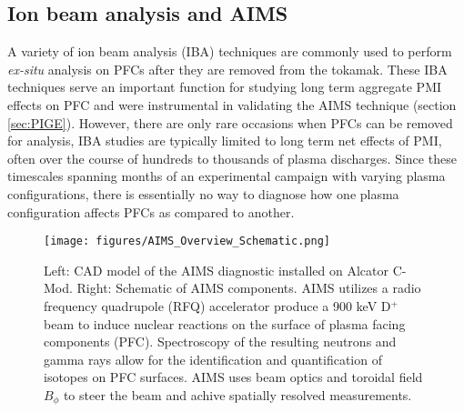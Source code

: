 \documentclass[final,3p,times,twocolumn]{elsarticle}
\begin{document}
\subsection{Ion beam analysis and AIMS}
\label{sec:AIMSOverview}

A variety of ion beam analysis (IBA) techniques are commonly used to perform \textit{ex-situ} analysis on PFCs after they are removed from the tokamak. These IBA techniques serve an important function for studying long term aggregate PMI effects on PFC \cite{wright2011plasma} and were instrumental in validating the AIMS technique (section \ref{sec:PIGE}). However, there are only rare occasions when PFCs can be removed for analysis, IBA studies are typically limited to long term net effects of PMI, often over the course of hundreds to thousands of plasma discharges.  Since these timescales spanning months of an experimental campaign with varying plasma configurations, there is essentially no way to diagnose how one plasma configuration affects PFCs as compared to another.


\begin{figure*}[h]
 \centering
  \texttt{[image: figures/AIMS\_Overview\_Schematic.png]}
 \caption{Left: CAD model of the AIMS diagnostic installed on Alcator C-Mod.  Right: Schematic of AIMS components.  AIMS utilizes a radio frequency quadrupole (RFQ) accelerator produce a 900 keV D$^+$ beam to induce nuclear reactions on the surface of plasma facing components (PFC). Spectroscopy of the resulting neutrons and gamma rays allow for the identification and quantification of isotopes on PFC surfaces. AIMS uses beam optics and toroidal field $B_\phi$ to steer the beam and achive spatially resolved measurements.}
 \label{fig:AIMSOverviewSchematic0}
\end{figure*}

%
\end{document}
